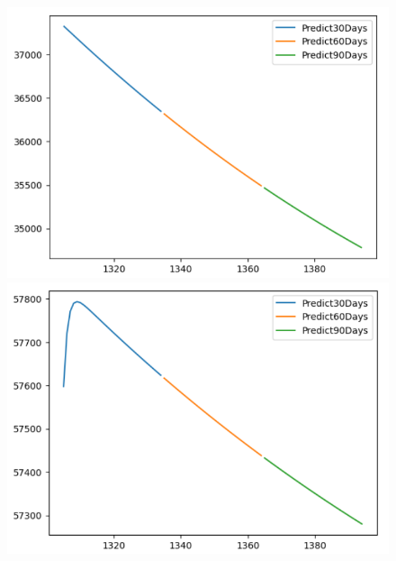 \begin{figure}[H]
\begin{minipage}{0.15\textwidth}
    \centering
    \includegraphics[width=1\textwidth]{resources/chapter-5/newdata1/predicted/BIDV_VARMA_9-1_30days.png}
    \end{minipage}
    \hfill
    \begin{minipage}{0.15\textwidth}
    \centering
    \includegraphics[width=1\textwidth]{resources/chapter-5/newdata1/predicted/VCB_VARMA_7-3_30days.png}
    \end{minipage}
    \hfill
    \begin{minipage}{0.15\textwidth}
    \centering

\end{minipage}
\end{figure}
